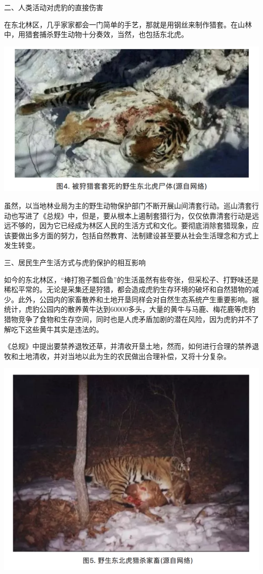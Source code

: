 \documentclass[]{book}
\begin{document}
二、人类活动对虎豹的直接伤害

在东北林区，几乎家家都会一门简单的手艺，那就是用钢丝来制作猎套。在山林中，用猎套捕杀野生动物十分奏效，当然，也包括东北虎。

\includegraphics[width=8.33in]{images/tiger4}

虽然，以当地林业局为主的野生动物保护部门不断开展山间清套行动。巡山清套行动也写进了《总规》中，但是，要从根本上遏制套猎行为，仅仅依靠清套行动是远远不够的，因为它已经成为林区人民的生活方式和文化。要彻底消除套猎现象，应该要做出多方面的努力，包括自然教育、法制建设甚至要从社会生活理念和方式上发生转变。

三、居民生产生活方式与虎豹保护的相互影响

如今的东北林区，``棒打狍子瓢舀鱼''的生活虽然有些夸张，但采松子、打野味还是稀松平常的。无论是采集还是狩猎，都会造成虎豹生存环境的破坏和自然猎物的减少。此外，公园内的家畜散养和土地开垦同样会对自然生态系统产生重要影响。据统计，虎豹公园内的散养黄牛达到60000多头，大量的黄牛与马鹿、梅花鹿等虎豹猎物竞争了食物和生存空间，同时也是人虎矛盾加剧的潜在风险，因为虎豹并不了解吃下这些黄牛其实是违法的。

《总规》中提出要禁养退牧还草，并清收开垦土地，然而，如何进行合理的禁养退牧和土地清收，并对当地以此为生的农民做出合理补偿，又将十分复杂。

\includegraphics[width=8.33in]{images/tiger5}
\end{document}
